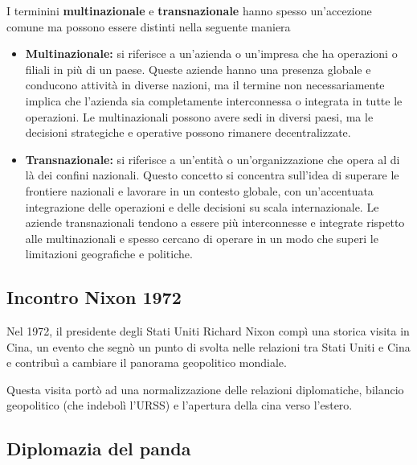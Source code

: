 \documentclass[a4paper]{article}
\begin{document}
I terminini \textbf{multinazionale} e \textbf{transnazionale} hanno spesso
un'accezione comune ma possono essere distinti nella seguente maniera
\begin{itemize}
    \item \textbf{Multinazionale:} si riferisce a un'azienda o un'impresa che
        ha operazioni o filiali in più di un paese.
        Queste aziende hanno una presenza globale e conducono attività in diverse nazioni,
        ma il termine non necessariamente implica che l'azienda sia completamente interconnessa
        o integrata in tutte le operazioni.
        Le multinazionali possono avere sedi in diversi paesi,
        ma le decisioni strategiche e operative possono rimanere decentralizzate.
        \item \textbf{Transnazionale:} si riferisce a un'entità o un'organizzazione che opera
        al di là dei confini nazionali.
        Questo concetto si concentra sull'idea di superare le frontiere nazionali
        e lavorare in un contesto globale,
        con un'accentuata integrazione delle operazioni e delle decisioni su scala internazionale.
        Le aziende transnazionali tendono a essere più interconnesse e
        integrate rispetto alle multinazionali e spesso cercano di operare
        in un modo che superi le limitazioni geografiche e politiche.
\end{itemize}

\subsection{Incontro Nixon 1972}

Nel 1972, il presidente degli Stati Uniti Richard Nixon compì
una storica visita in Cina, un evento che segnò un punto di svolta nelle
relazioni tra Stati Uniti e Cina e contribuì a cambiare il panorama geopolitico mondiale.

Questa visita portò ad una normalizzazione delle relazioni diplomatiche,
bilancio geopolitico (che indebolì l'URSS) e l'apertura della cina verso l'estero.

\subsection{Diplomazia del panda}

\end{document}
